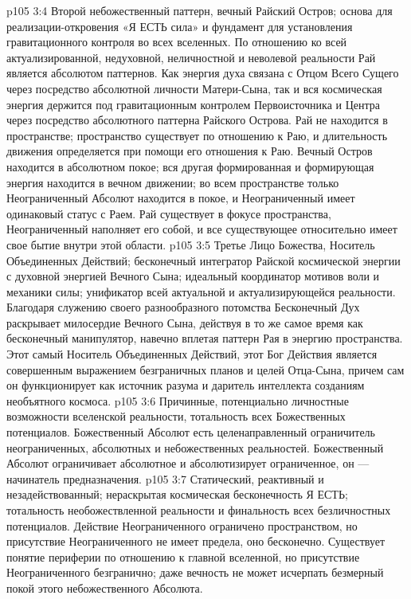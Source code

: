 \vs p105 3:4 \bibnobreakspace {} Второй небожественный паттерн, вечный Райский Остров; основа для реализации\hyp{}откровения «Я ЕСТЬ сила» и фундамент для установления гравитационного контроля во всех вселенных. По отношению ко всей актуализированной, недуховной, неличностной и неволевой реальности Рай является абсолютом паттернов. Как энергия духа связана с Отцом Всего Сущего через посредство абсолютной личности Матери\hyp{}Сына, так и вся космическая энергия держится под гравитационным контролем Первоисточника и Центра через посредство абсолютного паттерна Райского Острова. Рай не находится в пространстве; пространство существует по отношению к Раю, и длительность движения определяется при помощи его отношения к Раю. Вечный Остров находится в абсолютном покое; вся другая формированная и формирующая энергия находится в вечном движении; во всем пространстве только Неограниченный Абсолют находится в покое, и Неограниченный имеет одинаковый статус с Раем. Рай существует в фокусе пространства, Неограниченный наполняет его собой, и все существующее относительно имеет свое бытие внутри этой области.
\vs p105 3:5 \bibnobreakspace {} Третье Лицо Божества, Носитель Объединенных Действий; бесконечный интегратор Райской космической энергии с духовной энергией Вечного Сына; идеальный координатор мотивов воли и механики силы; унификатор всей актуальной и актуализирующейся реальности. Благодаря служению своего разнообразного потомства Бесконечный Дух раскрывает милосердие Вечного Сына, действуя в то же самое время как бесконечный манипулятор, навечно вплетая паттерн Рая в энергию пространства. Этот самый Носитель Объединенных Действий, этот Бог Действия является совершенным выражением безграничных планов и целей Отца\hyp{}Сына, причем сам он функционирует как источник разума и даритель интеллекта созданиям необъятного космоса.
\vs p105 3:6 \bibnobreakspace {} Причинные, потенциально личностные возможности вселенской реальности, тотальность всех Божественных потенциалов. Божественный Абсолют есть целенаправленный ограничитель неограниченных, абсолютных и небожественных реальностей. Божественный Абсолют ограничивает абсолютное и абсолютизирует ограниченное, он --- начинатель предназначения.
\vs p105 3:7 \bibnobreakspace {} Статический, реактивный и незадействованный; нераскрытая космическая бесконечность Я ЕСТЬ; тотальность необожествленной реальности и финальность всех безличностных потенциалов. Действие Неограниченного ограничено пространством, но присутствие Неограниченного не имеет предела, оно бесконечно. Существует понятие периферии по отношению к главной вселенной, но присутствие Неограниченного безгранично; даже вечность не может исчерпать безмерный покой этого небожественного Абсолюта.
